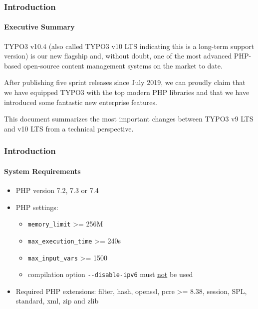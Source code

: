 \begin{frame}[fragile]
	\frametitle{Introduction}
	\framesubtitle{Executive Summary}

	\small
		TYPO3 v10.4 (also called TYPO3 v10 LTS indicating this is a long-term support version)
		is our new flagship and, without doubt, one of the most advanced PHP-based open-source
		content management systems on the market to date.

		\vspace{0.2cm}

		After publishing five sprint releases since July 2019, we can proudly claim that we
		have equipped TYPO3 with the top modern PHP libraries and that we have introduced some
		fantastic new enterprise features.

		\vspace{0.2cm}

		This document summarizes the most important changes between TYPO3 v9 LTS and v10 LTS
		from a technical perspective.

%


	\normalsize

\end{frame}


\begin{frame}[fragile]
	\frametitle{Introduction}
	\framesubtitle{System Requirements}

	\begin{itemize}
		\item PHP version 7.2, 7.3 or 7.4
		\item PHP settings:

			\begin{itemize}
				\item \texttt{memory\_limit} >= 256M
				\item \texttt{max\_execution\_time} >= 240s
				\item \texttt{max\_input\_vars} >= 1500
				\item compilation option \texttt{-}\texttt{-disable-ipv6} must \underline{not} be used
			\end{itemize}

			\item Required PHP extensions:\newline
				\small
					filter, hash, openssl, pcre >= 8.38, session, SPL, standard,
					xml, zip and zlib
				\normalsize

		\end{itemize}

\end{frame}

